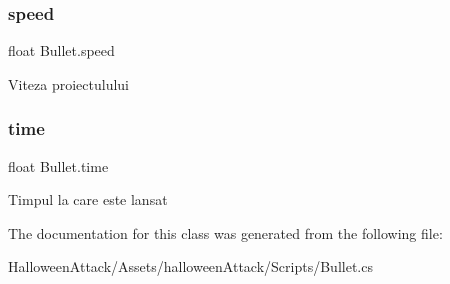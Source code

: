 \subsubsection{\texorpdfstring{speed}{speed}}
{\footnotesize\ttfamily float Bullet.\+speed}

Viteza proiectulului \mbox{\label{class_bullet_ae35c2a21d9d6abff09869e1a9f3b2053}} 
\subsubsection{\texorpdfstring{time}{time}}
{\footnotesize\ttfamily float Bullet.\+time}

Timpul la care este lansat 

The documentation for this class was generated from the following file\+:\begin{DoxyCompactItemize}
\item 
Halloween\+Attack/\+Assets/halloween\+Attack/\+Scripts/Bullet.\+cs\end{DoxyCompactItemize}
